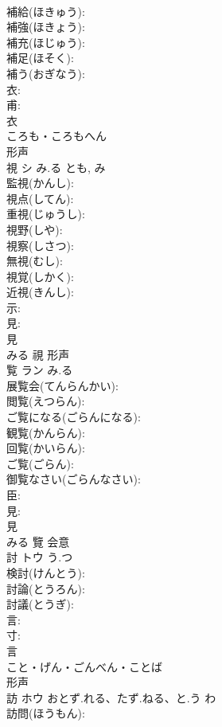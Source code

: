 \documentclass[8pt]{extreport}
\begin{document}
\begin{CJK}{UTF8}{min}
\\	補給(ほきゅう): 
\\	補強(ほきょう): 
\\	補充(ほじゅう): 
\\	補足(ほそく): 
\\	補う(おぎなう): 
\\	衣: 
\\	甫: 
\\	衣	
\\	ころも・ころもへん	
\\	形声 
\\	視	シ	み.る	とも, み	
\\	監視(かんし): 
\\	視点(してん): 
\\	重視(じゅうし): 
\\	視野(しや): 
\\	視察(しさつ): 
\\	無視(むし): 
\\	視覚(しかく): 
\\	近視(きんし): 
\\	示: 
\\	見: 
\\	見	
\\	みる	視	形声 
\\	覧	ラン	み.る		
\\	展覧会(てんらんかい): 
\\	閲覧(えつらん): 
\\	ご覧になる(ごらんになる): 
\\	観覧(かんらん): 
\\	回覧(かいらん): 
\\	ご覧(ごらん): 
\\	御覧なさい(ごらんなさい): 
\\	臣: 
\\	見: 
\\	見	
\\	みる	覽	会意 
\\	討	トウ	う.つ		
\\	検討(けんとう): 
\\	討論(とうろん): 
\\	討議(とうぎ): 
\\	言: 
\\	寸: 
\\	言	
\\	こと・げん・ごんべん・ことば	
\\	形声 
\\	訪	ホウ	おとず.れる、たず.ねる、と.う	わ	
\\	訪問(ほうもん): 

\end{CJK}
\end{document}
